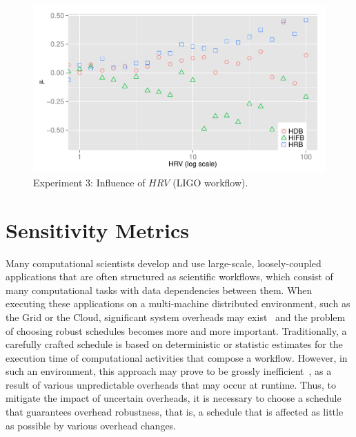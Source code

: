 \documentclass[final,5p,times,twocolumn]{elsarticle}
\begin{document}
\begin{figure}[htb]
\centering
	\includegraphics[width=\linewidth]{figure/exp3.pdf}
	\caption{Experiment 3: Influence of $HRV$ (LIGO workflow).}
	\label{fig:incluence_of_hrv}
	\vspace{-10pt}
\end{figure}




\section{Sensitivity Metrics}



Many computational scientists develop and use large-scale, loosely-coupled applications that are often structured as scientific workflows, which consist of many computational tasks with data dependencies between them. When executing these applications on a multi-machine distributed environment, such as the Grid or the Cloud, significant system overheads may exist~\cite{Chen, Prodan2008b, Dong2010, Yang03, WorkflowSim} and the problem of choosing robust schedules becomes more and more important. Traditionally, a carefully crafted schedule is based on deterministic or statistic estimates for the execution time of computational activities that compose a workflow. However, in such an environment, this approach may prove to be grossly inefficient~\cite{WorkflowSim}, as a result of various unpredictable overheads that may occur at runtime. 
Thus, to mitigate the impact of uncertain overheads, it is necessary to choose a schedule that guarantees overhead robustness, that is, a schedule that is affected as little as possible by various overhead changes.  
\end{document}
